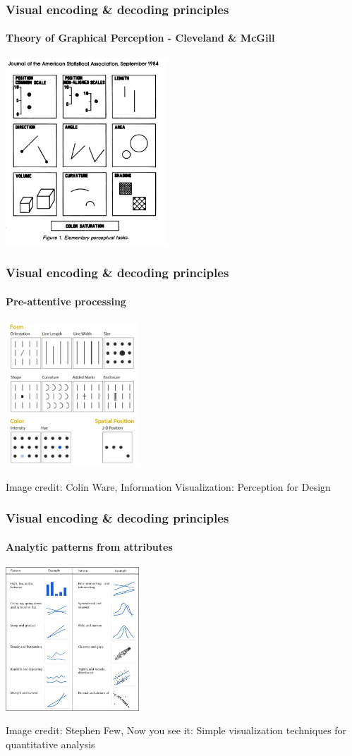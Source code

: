 \documentclass{beamer}
\begin{document}
\begin{frame}\frametitle{Visual encoding \& decoding principles}
\framesubtitle{Theory of Graphical Perception - Cleveland \& McGill}
\begin{center}
\includegraphics[width=60mm,scale=0.5]{cleveland.png}
\end{center}
\end{frame}


\begin{frame}\frametitle{Visual encoding \& decoding principles}
\framesubtitle{Pre-attentive processing}
\begin{center}
\includegraphics[width=50mm,scale=0.5]{colinware.jpg}
\end{center}
\tiny{Image credit:  Colin Ware, Information Visualization: Perception for Design}
\end{frame}


\begin{frame}\frametitle{Visual encoding \& decoding principles}
\framesubtitle{Analytic patterns from attributes}
\begin{center}
\includegraphics[width=50mm,scale=0.5]{few.jpg}
\end{center}
\tiny{Image credit:  Stephen Few, Now you see it: Simple visualization techniques for quantitative analysis}
\end{frame}
\end{document}
